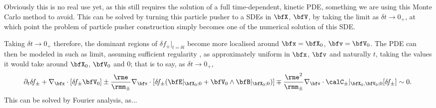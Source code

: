     Obviously this is no real use yet, as this still requires the solution of a full time-dependent, kinetic PDE, something we are using this Monte Carlo method to avoid. This can be solved by turning this particle pusher to a SDEs in $\bfX$, $\bfV$, by taking the limit as $\delta t  \rightarrow  0_{+}$, at which point the problem of particle pusher construction simply becomes one of the numerical solution of this SDE.
    
    Taking $\delta t  \rightarrow  0_{+}$ therefore, the dominant regions of $\delta\!f_{\pm}|_{t = \delta t}$ become more localised around $\bfx  =  \bfX_{0}$, $\bfv  =  \bfV_{0}$. The PDE can then be modeled in such as limit, assuming sufficient regularity , as approximately uniform in $\bfx$, $\bfv$ and naturally $t$, taking the values it would take around $\bfX_{0}$, $\bfV_{0}$ and $0$; that is to say, as $\delta t  \rightarrow  0_{+}$,
    \begin{equation}
        \partial_{t}\delta\!f_{\pm} + \nabla_{\bfx}\cdot[\delta\!f_{\pm}\bfV_{0}] \pm \frac{\rme}{\rmm_{\pm}}\nabla_{\bfv}\cdot[\delta\!f_{\pm}(\bfE|_{\bfX_{0}; 0} + \bfV_{0}\wedge\bfB|_{\bfX_{0}; 0})] \mp \frac{\rme^{2}}{\rmm_{\pm}}\nabla_{\bfv}\cdot\calC_{\pm}|_{\bfX_{0}, \bfV_{0}; 0}[\delta\!f_{\pm}]  \sim  0.
    \end{equation}
    This can be solved by Fourier analysis, as...
    